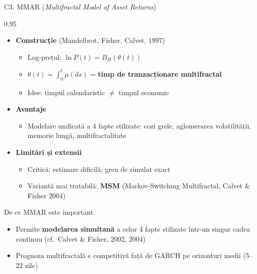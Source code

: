 \documentclass[9pt, aspectratio=169, t]{beamer}
\begin{document}
\begin{frame}[shrink=15]{C3. MMAR (\textit{Multifractal Model of Asset Returns})}
\begin{cminipage}{0.95\textwidth}
\begin{itemize}\setlength{\itemsep}{1pt}
    \item \textbf{Construcție} (Mandelbrot, Fisher, Calvet, 1997)
    \begin{itemize}\setlength{\itemsep}{0pt}
        \item Log-prețul: $\ln P(t)=B_H(\theta(t))$
        \item $\theta(t)=\int_0^t\mu(ds)$ = \textbf{timp de tranzacționare multifractal}
        \item Idee: timpul calendaristic $\neq$ timpul economic
    \end{itemize}
    \item \textbf{Avantaje}
    \begin{itemize}\setlength{\itemsep}{0pt}
        \item Modelare unificată a 4 fapte stilizate: cozi grele, aglomerarea volatilității, memorie lungă, multifractalitate
    \end{itemize}
    \item \textbf{Limitări și extensii}
    \begin{itemize}\setlength{\itemsep}{0pt}
        \item Critică: estimare dificilă; greu de simulat exact
        \item Variantă mai tratabilă: \textbf{MSM} (Markov-Switching Multifractal, Calvet \& Fisher 2004)
    \end{itemize}
\end{itemize}
\vspace{0.1cm}
\begin{exampleblock}{De ce MMAR este important}
\begin{itemize}\setlength{\itemsep}{0pt}
    \item Permite \textbf{modelarea simultană} a celor 4 fapte stilizate într-un singur cadru continuu (cf.\ Calvet \& Fisher, 2002, 2004)
    \item Prognoza multifractală e competitivă față de GARCH pe orizonturi medii (5--22 zile)
\end{itemize}
\end{exampleblock}
\end{cminipage}
\end{frame}
\end{document}

